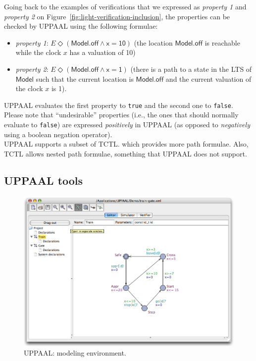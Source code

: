 Going back to the examples of verifications that we expressed as \emph{property 1} and \emph{property 2} on Figure~\ref{fig:light-verification-inclusion}, the properties can be checked by UPPAAL using the following formulae:
\begin{itemize}
  
  \item \emph{property 1}: $E\Diamond (\mathsf{Model.off \wedge x = 10})$ (the location $\mathsf{Model.off}$ is reachable while the clock $x$ has a valuation of 10)
  
  \item \emph{property 2}: $E\Diamond (\mathsf{Model.off \wedge x = 1})$ (there is a path to a state in the LTS of $\mathsf{Model}$ such that the current location is $\mathsf{Model.off}$ and the current valuation of the clock $x$ is 1).
  
\end{itemize}
UPPAAL evaluates the first property to \texttt{true} and the second one to \texttt{false}. Please note that ``undesirable'' properties (i.e., the ones that should normally evaluate to \texttt{false}) are expressed \emph{positively} in UPPAAL (as opposed to \emph{negatively} using a boolean negation operator).\\

UPPAAL supports a subset of TCTL. which provides more path formulae. Also, TCTL allows nested path formulae, something that UPPAAL does not support.\\


\subsection{UPPAAL tools}


\begin{figure}[htbp]
    \centering
    \includegraphics[width=\textwidth]{content/timed-automata/uppaal-1}
    \caption{UPPAAL: modeling environment.}
    \label{fig:uppaal-1}
\end{figure}

